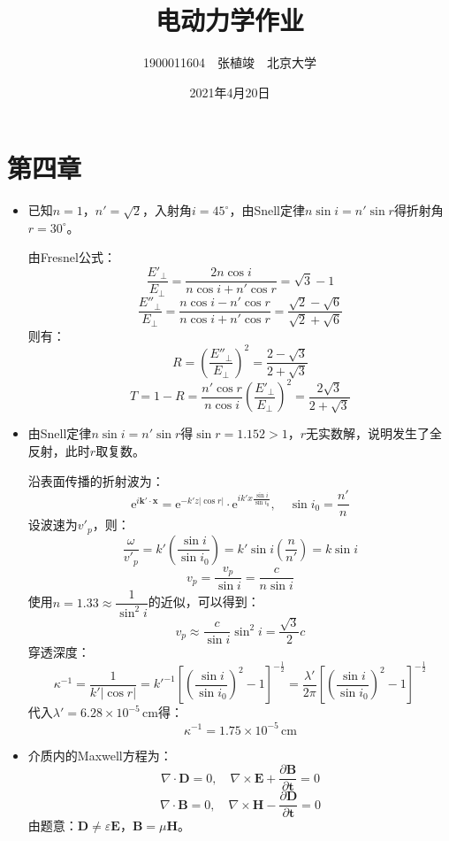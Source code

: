 \documentclass[a4paper,fontset=none]{ctexart}
\begin{document}
    \title{\textbf{电动力学作业}}
    \author{1900011604\ \ 张植竣\ \ 北京大学}
    \date{2021年4月20日}
    \maketitle

    \section*{第四章}

    \begin{itemize}

    \item[2.]
    已知$n=1$，$n'=\sqrt{2}$，入射角$i=45^\circ$，由Snell定律$n\sin i=n'\sin r$得折射角$r=30^\circ$。

    由Fresnel公式：
    \[
        \frac{E'_\perp}{E_\perp} = \frac{2n\cos i}{n\cos i + n'\cos r} = \sqrt{3}-1
    \]
    \[
        \frac{E''_\perp}{E_\perp} = \frac{n\cos i-n'\cos r}{n\cos i + n'\cos r} = \frac{\sqrt{2}-\sqrt{6}}{\sqrt{2}+\sqrt{6}}
    \]
    则有：
    \[
        R = \left(\frac{E''_\perp}{E_\perp}\right)^2 = \frac{2-\sqrt{3}}{2+\sqrt{3}}
    \]
    \[
        T = 1 - R = \frac{n'\cos r}{n\cos i}\left(\frac{E'_\perp}{E_\perp}\right)^2 = \frac{2\sqrt{3}}{2+\sqrt{3}}
    \]

    \item[3.]
    由Snell定律$n\sin i=n'\sin r$得$\sin r=1.152>1$，$r$无实数解，说明发生了全反射，此时$r$取复数。

    沿表面传播的折射波为：
    \[
        \mathrm{e}^{i\bm{k}'\cdot\bm{x}} = \mathrm{e}^{-k'z|\cos r|} \cdot \mathrm{e}^{ik'x\tfrac{\sin i}{\sin i_0}},\quad \sin i_0=\frac{n'}{n}
    \]
    设波速为$v'_p$，则：
    \[
        \frac{\omega}{v'_p} = k'\left(\frac{\sin i}{\sin i_0}\right) = k'\sin i\left(\frac{n}{n'}\right) = k\sin i
    \]
    \[
        v_p = \frac{v_p}{\sin i} = \frac{c}{n\sin i}
    \]
    使用$n=1.33\approx\dfrac{1}{\sin^2 i}$的近似，可以得到：
    \[
        v_p \approx \dfrac{c}{\sin i}\sin^2 i = \frac{\sqrt{3}}{2}c
    \]
    穿透深度：
    \[
        \kappa^{-1} = \frac{1}{k'|\cos r|} = k'^{-1}\left[\left(\frac{\sin i}{\sin i_0}\right)^2-1\right]^{-\tfrac{1}{2}} = \frac{\lambda'}{2\pi}\left[\left(\frac{\sin i}{\sin i_0}\right)^2-1\right]^{-\tfrac{1}{2}}
    \]
    代入$\lambda'=6.28\times10^{-5}\,\mathrm{cm}$得：
    \[
        \kappa^{-1}=1.75\times10^{-5}\,\mathrm{cm}
    \]

    \item[4.]
    介质内的Maxwell方程为：
    \[
        \nabla\cdot\bm{D} = 0,\quad \nabla\times\bm{E} + \frac{\partial\bm{B}}{\partial\bm{t}} = 0
    \]
    \[
        \nabla\cdot\bm{B} = 0,\quad \nabla\times\bm{H} - \frac{\partial\bm{D}}{\partial\bm{t}} = 0
    \]
    由题意：$\bm{D}\neq\varepsilon\bm{E}$，$\bm{B}=\mu\bm{H}$。


\end{itemize}
\end{document}
